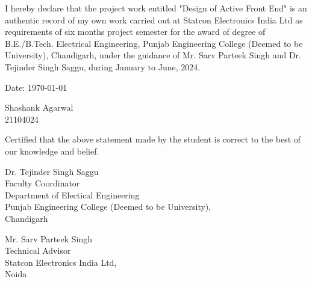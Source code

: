 I hereby declare that the project work entitled "Design of Active Front End" is
an authentic record of my own work carried out at Statcon Electronics India Ltd
as requirements of six months project semester for the award of degree of
B.E./B.Tech. Electrical Engineering, Punjab Engineering College (Deemed to be
University), Chandigarh, under the guidance of Mr. Sarv Parteek Singh and Dr.
Tejinder Singh Saggu, during January to June, 2024.

\vspace*{2.5cm}
\noindent
\begin{minipage}[t]{0.5\textwidth}
    \raggedright
    {Date: {\today}}
\end{minipage}
\hfill
\begin{minipage}[t]{0.5\textwidth}
    \raggedleft
    {Shashank Agarwal\\
    21104024}

\end{minipage}
\vfill

\noindent
Certified that the above statement made by the student is correct to the best of our knowledge and belief.

\vspace*{2cm}

\noindent
\begin{minipage}[t]{0.5\textwidth}
    \raggedright
    Dr. Tejinder Singh Saggu\\
    Faculty Coordinator\\
    Department of Electical Engineering\\
    Punjab Engineering College (Deemed to be University),\\
    Chandigarh
\end{minipage}
\hfill
\begin{minipage}[t]{0.5\textwidth}
    \raggedleft
    Mr. Sarv Parteek Singh\\
    Technical Advisor\\
    Statcon Electronics India Ltd,\\
    Noida

\end{minipage}